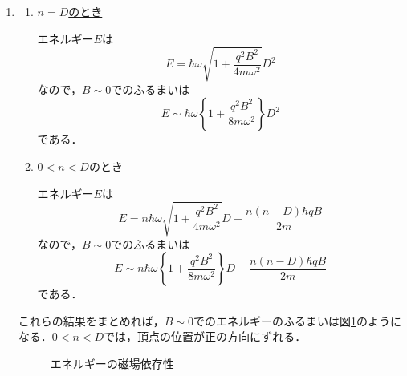 \documentclass[a4paper,pdflatex,ja=standard]{bxjsarticle}
\begin{document}
\begin{enumerate}
  \item 
  \begin{enumerate}
    \item 
    \uline{$n=D$のとき}

    エネルギー$E$は
    \begin{equation}
      E
      =
      \hbar\omega\sqrt{1+\frac{q^2B^2}{4m\omega^2}}D^2
    \end{equation}
    なので，$B\sim 0$でのふるまいは
    \begin{equation}
      E
      \sim
      \hbar\omega
      \left\{ 1+\frac{q^2B^2}{8m\omega^2}\right\}
      D^2
    \end{equation}
    である．
    
    \item 
    \uline{$0<n<D$のとき}

    エネルギー$E$は
    \begin{equation}
      E
      =
      n\hbar\omega\sqrt{1+\frac{q^2B^2}{4m\omega^2}}D
      -
      \frac{n(n-D)\hbar qB}{2m}
    \end{equation}
    なので，$B\sim 0$でのふるまいは
    \begin{equation}
      E
      \sim
      n\hbar\omega
      \left\{ 1+\frac{q^2B^2}{8m\omega^2}\right\}
      D
      -
      \frac{n(n-D)\hbar qB}{2m}
    \end{equation}
    である．

  \end{enumerate}

  これらの結果をまとめれば，$B\sim 0$でのエネルギーのふるまいは図\ref{ene_mag}のようになる．$0<n<D$では，頂点の位置が正の方向にずれる．

  \begin{figure}[ht]
    \centering    
      \caption{エネルギーの磁場依存性}
      \label{ene_mag}
  \end{figure}

\end{enumerate}
\end{document}
